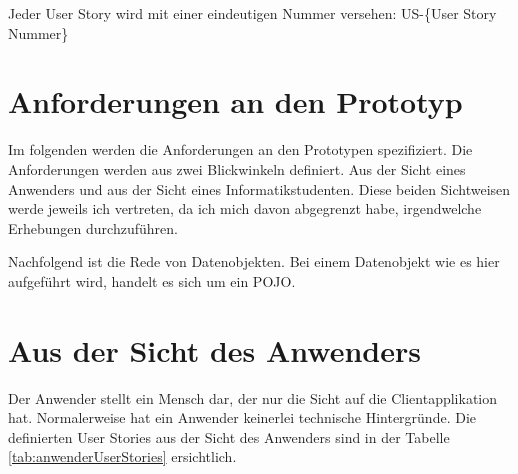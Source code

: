 \documentclass[abstracton, listof=totocnumbered,
bibliography=totocnumbered]{scrreprt}
\begin{document}
  Jeder User Story wird mit einer eindeutigen Nummer versehen: US-\{User Story
  Nummer\}
  
  \section{Anforderungen an den Prototyp}
  
  Im folgenden werden die Anforderungen an den Prototypen spezifiziert. Die
  Anforderungen werden aus zwei Blickwinkeln definiert. Aus der Sicht eines
  Anwenders und aus der Sicht eines Informatikstudenten. Diese beiden
  Sichtweisen werde jeweils ich vertreten, da ich mich davon abgegrenzt habe,
  irgendwelche Erhebungen durchzuführen.
  
  Nachfolgend ist die Rede von Datenobjekten. Bei einem Datenobjekt wie es hier
  aufgeführt wird, handelt es sich um ein \ac{POJO}. 
  
  \newpage
  
  \section{Aus der Sicht des Anwenders}
  
  Der Anwender stellt ein Mensch dar, der nur die Sicht auf die
  Clientapplikation hat. Normalerweise hat ein Anwender keinerlei technische
  Hintergründe. Die definierten User Stories aus der Sicht des Anwenders sind in
  der Tabelle \ref{tab:anwenderUserStories} ersichtlich.
  \newline
  
\end{document}

